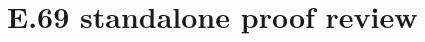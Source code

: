 \documentclass[11pt,a4paper]{article}
\begin{document}
\section*{E.69 standalone proof review}



\end{document}
